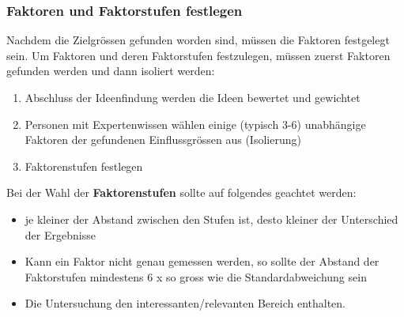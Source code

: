 
\subsubsection{Faktoren und Faktorstufen festlegen}
Nachdem die Zielgrössen gefunden worden sind, müssen die Faktoren festgelegt sein. Um Faktoren und deren Faktorstufen festzulegen, müssen zuerst Faktoren gefunden werden und dann isoliert werden:
\begin{enumerate}
    \item  Abschluss der Ideenfindung werden die Ideen bewertet und gewichtet
    \item Personen mit Expertenwissen wählen einige (typisch 3-6) unabhängige Faktoren der gefundenen Einflussgrössen aus (Isolierung)
    \item Faktorenstufen festlegen
\end{enumerate}
\newline

Bei der Wahl der \textbf{Faktorenstufen} sollte auf folgendes geachtet werden:
\begin{itemize}
    \item je kleiner der Abstand zwischen den Stufen ist, desto kleiner der Unterschied der Ergebnisse 
    \item Kann ein Faktor nicht genau gemessen werden, so sollte der Abstand der Faktorstufen mindestens 6 x so gross wie die Standardabweichung sein 
    \item Die Untersuchung den interessanten/relevanten Bereich enthalten. 
\end{itemize} 

